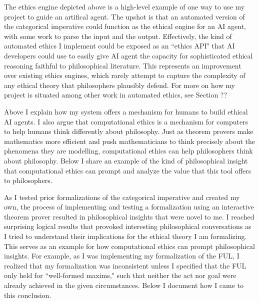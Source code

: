 \begin{isabellebody}
\begin{isamarkuptext}
The ethics engine depicted above is a high-level example of one way to use my project to guide an artifical agent. The 
upshot is that an automated version of the categorical imperative could function as the ethical engine 
for an AI agent, with some work to parse the input and the output. Effectively, the kind 
of automated ethics I implement could be 
exposed as an ``ethics API" that AI developers could use to easily give AI agent the capacity for 
sophisticated ethical reasoning faithful to philosophical literature. This represents an improvement 
over existing ethics engines, which rarely attempt to capture the complexity 
of any ethical theory that philosophers plausibly defend. For more on how my project is situated 
among other work in automated ethics, see Section ??%
\end{isamarkuptext}\isamarkuptrue%
%
\isadelimdocument
%
\endisadelimdocument
%
\isatagdocument
%
\isamarkuptrue%
%
\endisatagdocument
{\isafolddocument}%
%
\isadelimdocument
%
\endisadelimdocument
%
\begin{isamarkuptext}%
Above I explain how my system offers a mechanism for humans to build ethical AI agents. I also 
argue that computational ethics is a mechanism for computers to help humans think differently about 
philosophy. Just as theorem provers make mathematics more efficient and push mathematicians to think 
precisely about the phenomena they are modelling, computational ethics can help philosophers think about 
philosophy. Below I share an example of the kind of philosophical insight that computational ethics 
can prompt and analyze the value that this tool offers to philosophers.%
\end{isamarkuptext}\isamarkuptrue%
%
\isadelimdocument
%
\endisadelimdocument
%
\isatagdocument
%
\isamarkuptrue%
%
\endisatagdocument
{\isafolddocument}%
%
\isadelimdocument
%
\endisadelimdocument
%
\begin{isamarkuptext}%
As I tested prior formalizations of the categorical imperative and created my own, the process 
of implementing and testing a formalization using an interactive theorem prover resulted in philosophical 
insights that were novel to me. I reached surprising logical results that provoked 
interesting philosophical conversations as I tried to understand their implications for the ethical 
theory I am formalizing. This serves as an example for how computational ethics can prompt philosophical 
insights. For example, as I was implementing my formalization of the FUL, I realized
that my formalization was inconsistent unless I specified that the FUL only held for ``well-formed maxims,"
such that neither the act nor goal were already achieved in the given circumstances. Below I document how 
I came to this conclusion. 


\end{isamarkuptext}
\end{isabellebody}
